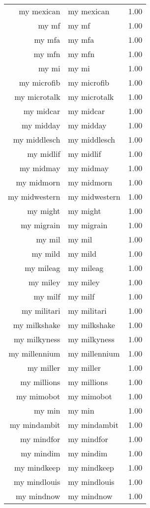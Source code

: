 \begin{table}[ht]
\begin{tabular}{rlr}
  my mexican & my mexican & 1.00 \\ 
  my mf & my mf & 1.00 \\ 
  my mfa & my mfa & 1.00 \\ 
  my mfn & my mfn & 1.00 \\ 
  my mi & my mi & 1.00 \\ 
  my microfib & my microfib & 1.00 \\ 
  my microtalk & my microtalk & 1.00 \\ 
  my midcar & my midcar & 1.00 \\ 
  my midday & my midday & 1.00 \\ 
  my middlesch & my middlesch & 1.00 \\ 
  my midlif & my midlif & 1.00 \\ 
  my midmay & my midmay & 1.00 \\ 
  my midmorn & my midmorn & 1.00 \\ 
  my midwestern & my midwestern & 1.00 \\ 
  my might & my might & 1.00 \\ 
  my migrain & my migrain & 1.00 \\ 
  my mil & my mil & 1.00 \\ 
  my mild & my mild & 1.00 \\ 
  my mileag & my mileag & 1.00 \\ 
  my miley & my miley & 1.00 \\ 
  my milf & my milf & 1.00 \\ 
  my militari & my militari & 1.00 \\ 
  my milkshake & my milkshake & 1.00 \\ 
  my milkyness & my milkyness & 1.00 \\ 
  my millennium & my millennium & 1.00 \\ 
  my miller & my miller & 1.00 \\ 
  my millions & my millions & 1.00 \\ 
  my mimobot & my mimobot & 1.00 \\ 
  my min & my min & 1.00 \\ 
  my mindambit & my mindambit & 1.00 \\ 
  my mindfor & my mindfor & 1.00 \\ 
  my mindim & my mindim & 1.00 \\ 
  my mindkeep & my mindkeep & 1.00 \\ 
  my mindlouis & my mindlouis & 1.00 \\ 
  my mindnow & my mindnow & 1.00 \\ 

\end{tabular}
\end{table}
